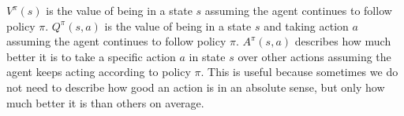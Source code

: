 \documentclass[10pt,journal,compsoc]{IEEEtran}
\begin{document}
\begin{math}V^\pi(s)\end{math} is the value of being in a state \begin{math}s\end{math} assuming the agent continues to follow policy \begin{math}\pi\end{math}. \begin{math}Q^\pi(s,a)\end{math} is the value of being in a state \begin{math}s\end{math} and taking action \begin{math}a\end{math} assuming the agent continues to follow policy \begin{math}\pi\end{math}. \begin{math}A^\pi(s,a)\end{math} describes how much better it is to take a specific action \begin{math}a\end{math}  in state \begin{math}s\end{math} over other actions assuming the agent keeps acting according to policy \begin{math}\pi\end{math}. This is useful because sometimes we do not need to describe how good an action is in an absolute sense, but only how much better it is than others on average.
\end{document}
